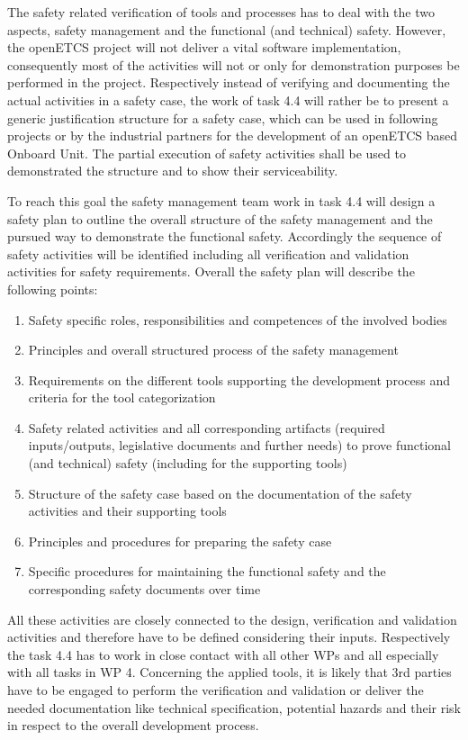 The safety related verification of tools and processes has to deal with the two aspects, safety management and the functional (and technical) safety. However, the openETCS project will not deliver a vital software implementation, consequently most of the activities will not or only for demonstration purposes be performed in the project. Respectively instead of verifying and documenting the actual activities in a safety case, the work of task 4.4 will rather be to present a generic justification structure for a safety case, which can be used in following projects or by the industrial partners for the development of an openETCS based Onboard Unit. The partial execution of safety activities shall be used to demonstrated the structure and to show their serviceability. 

To reach this goal the safety management team work in task 4.4 will design a safety plan to outline the overall structure of the safety management and the pursued way to demonstrate the functional safety. Accordingly the sequence of safety activities will be identified including all verification and validation activities for safety requirements. Overall the safety plan will describe the following points:
\begin{enumerate}
\item  Safety specific roles, responsibilities and competences of the involved bodies
\item  Principles and overall structured process of the safety management
\item  Requirements on the different tools supporting the development process and criteria for the tool categorization
\item  Safety related activities and all corresponding artifacts (required inputs/outputs, legislative documents and further needs) to prove functional (and technical) safety (including for the supporting tools) 
\item  Structure of the safety case based on the documentation of the safety activities and their supporting tools
\item  Principles and procedures for preparing the safety case
\item  Specific procedures for maintaining the functional safety and the corresponding safety documents over time
\end{enumerate}

All these activities are closely connected to the design, verification and validation activities and therefore have to be defined considering their inputs. Respectively the task 4.4 has to work in close contact with all other WPs and all especially with all tasks in WP 4. Concerning the applied tools, it is likely that 3rd parties have to be engaged to perform the verification and validation or deliver the needed documentation like technical specification, potential hazards and their risk in respect to the overall development process.

